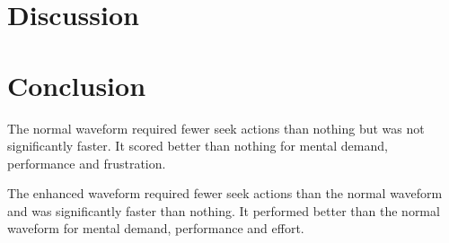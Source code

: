 \section{Discussion}

\section{Conclusion}
The normal waveform required fewer seek actions than nothing but was not significantly faster. It scored better than
nothing for mental demand, performance and frustration.

The enhanced waveform required fewer seek actions than the normal waveform and was significantly faster than nothing.
It performed better than the normal waveform for mental demand, performance and effort.



